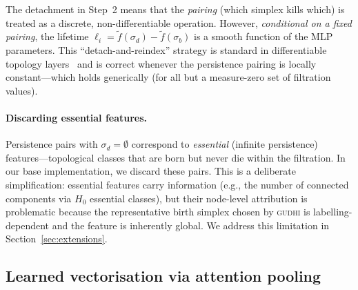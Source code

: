 \begin{remark}
\label{rmk:grad_path}
The detachment in Step~2 means that the \emph{pairing} (which simplex kills which) is treated as a discrete, non-differentiable operation. However, \emph{conditional on a fixed pairing}, the lifetime $\ell_i = \tilde{f}(\sigma_d) - \tilde{f}(\sigma_b)$ is a smooth function of the MLP parameters. This ``detach-and-reindex'' strategy is standard in differentiable topology layers~\cite{bruel2019topology, carriere2021optimizing} and is correct whenever the persistence pairing is locally constant---which holds generically (for all but a measure-zero set of filtration values).
\end{remark}

\paragraph{Discarding essential features.}
Persistence pairs with $\sigma_d = \emptyset$ correspond to \emph{essential} (infinite persistence) features---topological classes that are born but never die within the filtration. In our base implementation, we discard these pairs. This is a deliberate simplification: essential features carry information (e.g., the number of connected components via $H_0$ essential classes), but their node-level attribution is problematic because the representative birth simplex chosen by \textsc{gudhi} is labelling-dependent and the feature is inherently global. We address this limitation in Section~\ref{sec:extensions}.


\subsection{Learned vectorisation via attention pooling}

